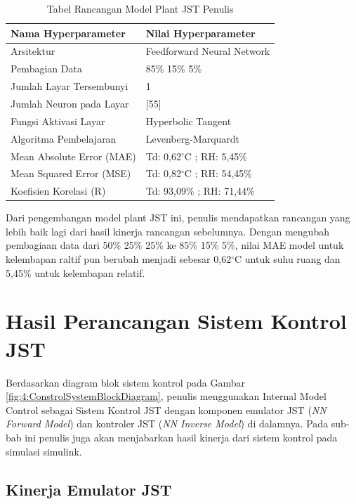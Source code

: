 \begin{table}[!h]
	\caption{Tabel Rancangan Model Plant JST Penulis}
	\label{tbl:5:NNPlantRidhan}
	\centering
	\begin{tabular}{|p{5.7cm}|p{5cm}|}
		\hline
		\textbf{Nama Hyperparameter} & \textbf{Nilai Hyperparameter} \\ \hline
		Arsitektur & Feedforward Neural Network \\ \hline
		Pembagian Data & 85\% 15\% 5\% \\ \hline 
		Jumlah Layar Tersembunyi & 1 \\ \hline
		Jumlah Neuron pada Layar & [55] \\ \hline
		Fungsi Aktivasi Layar & Hyperbolic Tangent \\ \hline
		Algoritma Pembelajaran & Levenberg-Marquardt \\ \hline
		Mean Absolute Error (MAE) & Td: 0,62$^\circ$C ; RH: 5,45\% \\ \hline
		Mean Squared Error (MSE) & Td: 0,82$^\circ$C ; RH: 54,45\% \\ \hline
		Koefisien Korelasi (R) & Td: 93,09\% ; RH: 71,44\% \\ \hline
	\end{tabular}
\end{table}

Dari pengembangan model plant JST ini, penulis mendapatkan rancangan yang lebih baik lagi dari hasil kinerja rancangan sebelumnya. Dengan mengubah pembagiaan data dari 50\% 25\% 25\% ke 85\% 15\% 5\%, nilai MAE model untuk kelembapan raltif pun berubah menjadi sebesar 0,62$^\circ$C untuk suhu ruang dan 5,45\% untuk kelembapan relatif.

\section{Hasil Perancangan Sistem Kontrol JST}

Berdasarkan diagram blok sistem kontrol pada Gambar \ref{fig:4:ConstrolSystemBlockDiagram}, penulis menggunakan Internal Model Control sebagai Sistem Kontrol JST dengan komponen emulator JST (\textit{NN Forward Model}) dan kontroler JST (\textit{NN Inverse Model}) di dalamnya. Pada sub-bab ini penulis juga akan menjabarkan hasil kinerja dari sistem kontrol pada simulasi simulink.

\subsection{Kinerja Emulator JST}

